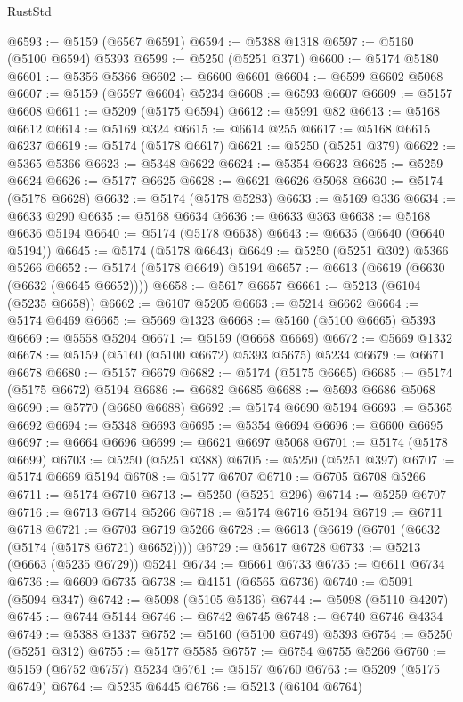 \begin{lexlean}{RustStd}
\begin{coremodule}
@6593 := @5159 (@6567 @6591)
@6594 := @5388 @1318
@6597 := @5160 (@5100 @6594) @5393
@6599 := @5250 (@5251 @371)
@6600 := @5174 @5180
@6601 := @5356 @5366
@6602 := @6600 @6601
@6604 := @6599 @6602 @5068
@6607 := @5159 (@6597 @6604) @5234
@6608 := @6593 @6607
@6609 := @5157 @6608
@6611 := @5209 (@5175 @6594)
@6612 := @5991 @82
@6613 := @5168 @6612
@6614 := @5169 @324
@6615 := @6614 @255
@6617 := @5168 @6615 @6237
@6619 := @5174 (@5178 @6617)
@6621 := @5250 (@5251 @379)
@6622 := @5365 @5366
@6623 := @5348 @6622
@6624 := @5354 @6623
@6625 := @5259 @6624
@6626 := @5177 @6625
@6628 := @6621 @6626 @5068
@6630 := @5174 (@5178 @6628)
@6632 := @5174 (@5178 @5283)
@6633 := @5169 @336
@6634 := @6633 @290
@6635 := @5168 @6634
@6636 := @6633 @363
@6638 := @5168 @6636 @5194
@6640 := @5174 (@5178 @6638)
@6643 := @6635 (@6640 (@6640 @5194))
@6645 := @5174 (@5178 @6643)
@6649 := @5250 (@5251 @302) @5366 @5266
@6652 := @5174 (@5178 @6649) @5194
@6657 := @6613 (@6619 (@6630 (@6632 (@6645 @6652))))
@6658 := @5617 @6657
@6661 := @5213 (@6104 (@5235 @6658))
@6662 := @6107 @5205
@6663 := @5214 @6662
@6664 := @5174 @6469
@6665 := @5669 @1323
@6668 := @5160 (@5100 @6665) @5393
@6669 := @5558 @5204
@6671 := @5159 (@6668 @6669)
@6672 := @5669 @1332
@6678 := @5159 (@5160 (@5100 @6672) @5393 @5675) @5234
@6679 := @6671 @6678
@6680 := @5157 @6679
@6682 := @5174 (@5175 @6665)
@6685 := @5174 (@5175 @6672) @5194
@6686 := @6682 @6685
@6688 := @5693 @6686 @5068
@6690 := @5770 (@6680 @6688)
@6692 := @5174 @6690 @5194
@6693 := @5365 @6692
@6694 := @5348 @6693
@6695 := @5354 @6694
@6696 := @6600 @6695
@6697 := @6664 @6696
@6699 := @6621 @6697 @5068
@6701 := @5174 (@5178 @6699)
@6703 := @5250 (@5251 @388)
@6705 := @5250 (@5251 @397)
@6707 := @5174 @6669 @5194
@6708 := @5177 @6707
@6710 := @6705 @6708 @5266
@6711 := @5174 @6710
@6713 := @5250 (@5251 @296)
@6714 := @5259 @6707
@6716 := @6713 @6714 @5266
@6718 := @5174 @6716 @5194
@6719 := @6711 @6718
@6721 := @6703 @6719 @5266
@6728 := @6613 (@6619 (@6701 (@6632 (@5174 (@5178 @6721) @6652))))
@6729 := @5617 @6728
@6733 := @5213 (@6663 (@5235 @6729)) @5241
@6734 := @6661 @6733
@6735 := @6611 @6734
@6736 := @6609 @6735
@6738 := @4151 (@6565 @6736)
@6740 := @5091 (@5094 @347)
@6742 := @5098 (@5105 @5136)
@6744 := @5098 (@5110 @4207)
@6745 := @6744 @5144
@6746 := @6742 @6745
@6748 := @6740 @6746 @4334
@6749 := @5388 @1337
@6752 := @5160 (@5100 @6749) @5393
@6754 := @5250 (@5251 @312)
@6755 := @5177 @5585
@6757 := @6754 @6755 @5266
@6760 := @5159 (@6752 @6757) @5234
@6761 := @5157 @6760
@6763 := @5209 (@5175 @6749)
@6764 := @5235 @6445
@6766 := @5213 (@6104 @6764)

\end{coremodule}
\end{lexlean}
